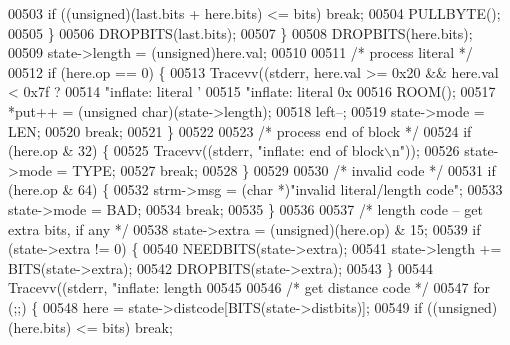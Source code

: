 \begin{DoxyCode}
{{{{00503                     \textcolor{keywordflow}{if} ((\textcolor{keywordtype}{unsigned})(last.bits + here.bits) <= bits) \textcolor{keywordflow}{break};
00504                     PULLBYTE();
00505                 \}
00506                 DROPBITS(last.bits);
00507             \}
00508             DROPBITS(here.bits);
00509             state->length = (unsigned)here.val;
00510 
00511             \textcolor{comment}{/* process literal */}
00512             if (here.op == 0) \{
00513                 Tracevv((stderr, here.val >= 0x20 && here.val < 0x7f ?
00514                         \textcolor{stringliteral}{"inflate:         literal '%
00515                         \textcolor{stringliteral}{"inflate:         literal 0x%
00516                 ROOM();
00517                 *put++ = (\textcolor{keywordtype}{unsigned} char)(state->length);
00518                 left--;
00519                 state->mode = LEN;
00520                 \textcolor{keywordflow}{break};
00521             \}
00522 
00523             \textcolor{comment}{/* process end of block */}
00524             \textcolor{keywordflow}{if} (here.op & 32) \{
00525                 Tracevv((stderr, \textcolor{stringliteral}{"inflate:         end of block\(\backslash\)n"}));
00526                 state->mode = TYPE;
00527                 \textcolor{keywordflow}{break};
00528             \}
00529 
00530             \textcolor{comment}{/* invalid code */}
00531             \textcolor{keywordflow}{if} (here.op & 64) \{
00532                 strm->msg = (\textcolor{keywordtype}{char} *)\textcolor{stringliteral}{"invalid literal/length code"};
00533                 state->mode = BAD;
00534                 \textcolor{keywordflow}{break};
00535             \}
00536 
00537             \textcolor{comment}{/* length code -- get extra bits, if any */}
00538             state->extra = (unsigned)(here.op) & 15;
00539             \textcolor{keywordflow}{if} (state->extra != 0) \{
00540                 NEEDBITS(state->extra);
00541                 state->length += BITS(state->extra);
00542                 DROPBITS(state->extra);
00543             \}
00544             Tracevv((stderr, \textcolor{stringliteral}{"inflate:         length %
00545 
00546             \textcolor{comment}{/* get distance code */}
00547             \textcolor{keywordflow}{for} (;;) \{
00548                 here = state->distcode[BITS(state->distbits)];
00549                 \textcolor{keywordflow}{if} ((\textcolor{keywordtype}{unsigned})(here.bits) <= bits) \textcolor{keywordflow}{break};
}}}}}}}
\end{DoxyCode}
